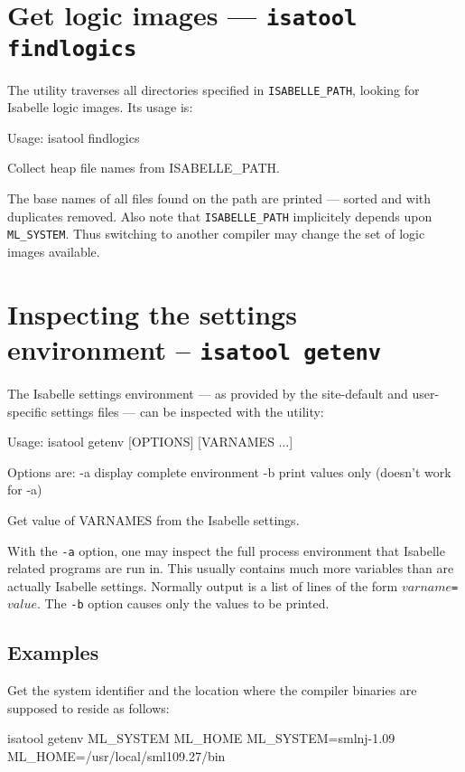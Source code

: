 \section{Get logic images --- \texttt{isatool findlogics}}

The  utility traverses all directories specified in
\texttt{ISABELLE_PATH}, looking for Isabelle logic images. Its usage
is:
\begin{ttbox}
Usage: isatool findlogics

  Collect heap file names from ISABELLE_PATH.
\end{ttbox}
The base names of all files found on the path are printed --- sorted
and with duplicates removed. Also note that \texttt{ISABELLE_PATH}
implicitely depends upon \texttt{ML_SYSTEM}. Thus switching to another
{\ML} compiler may change the set of logic images available.


\section{Inspecting the settings environment -- \texttt{isatool getenv}}
\label{sec:tool-getenv}

The Isabelle settings environment --- as provided by the site-default
and user-specific settings files --- can be inspected with the
 utility:
\begin{ttbox}
Usage: isatool getenv [OPTIONS] [VARNAMES ...]

  Options are:
    -a           display complete environment
    -b           print values only (doesn't work for -a)

  Get value of VARNAMES from the Isabelle settings.
\end{ttbox}

With the \texttt{-a} option, one may inspect the full process
environment that Isabelle related programs are run in. This usually
contains much more variables than are actually Isabelle settings.
Normally output is a list of lines of the form
\mbox{$varname$\texttt{=}$value$}. The \texttt{-b} option causes only
the values to be printed.


\subsection*{Examples}

Get the {\ML} system identifier and the location where the compiler
binaries are supposed to reside as follows:
\begin{ttbox}
isatool getenv ML_SYSTEM ML_HOME
{\out ML_SYSTEM=smlnj-1.09}
{\out ML_HOME=/usr/local/sml109.27/bin}
\end{ttbox}

